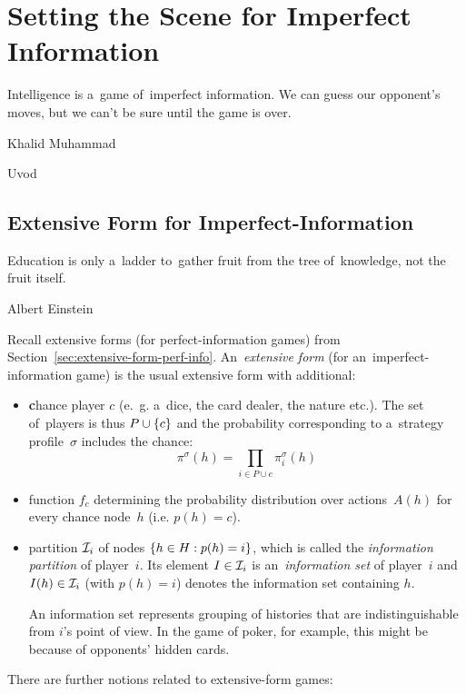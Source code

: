 \chapter{Setting the Scene for Imperfect Information}
\epigraph{
  Intelligence is a~game of~imperfect information.
  We can guess our opponent's moves, but we can't be sure until the game is over.
}{Khalid Muhammad}
\todo Uvod

\section{Extensive Form for Imperfect-Information}
\label{sec:extensive-form-imperf-info}
\epigraph{
  Education is only a~ladder to~gather fruit from the tree of~knowledge, not the fruit itself.
}{Albert Einstein}
Recall extensive forms (for perfect-information games) from Section~\ref{sec:extensive-form-perf-info}.
An~\emph{extensive form} (for an~imperfect-information game) is the usual extensive form with additional:
\begin{itemize}
  \item \textbf{c}hance player $c$ (e.~g. a~dice, the card dealer, the nature etc.).
    The set of~players is thus $P \cup \left\{ c \right\}$ and the probability corresponding to a~strategy profile~$\sigma$ includes the chance:
    \[\pi ^\sigma(h) = \prod _{i \in P \cup {c}} \pi _i ^\sigma (h)\]

  \item function $f_c$ determining the probability distribution over actions~$A(h)$ for every chance node~$h$ (i.e. $p(h) = c$).

  \item partition $\mathcal{I}_i$ of nodes $\left\{ h \in H: p(h) = i \right\}$, which is called the \emph{information partition} of player~$i$.
    Its element $I \in \mathcal{I}_i$ is an~\emph{information set} of player~$i$ and $I(h) \in \mathcal{I}_i$ (with $p(h) = i$) denotes the information set containing $h$.

    An information set represents grouping of histories that are indistinguishable from $i$'s point of view.
    In the game of poker, for example, this might be because of  opponents' hidden cards.
\end{itemize}
\noindent
There are further notions related to extensive-form games:
